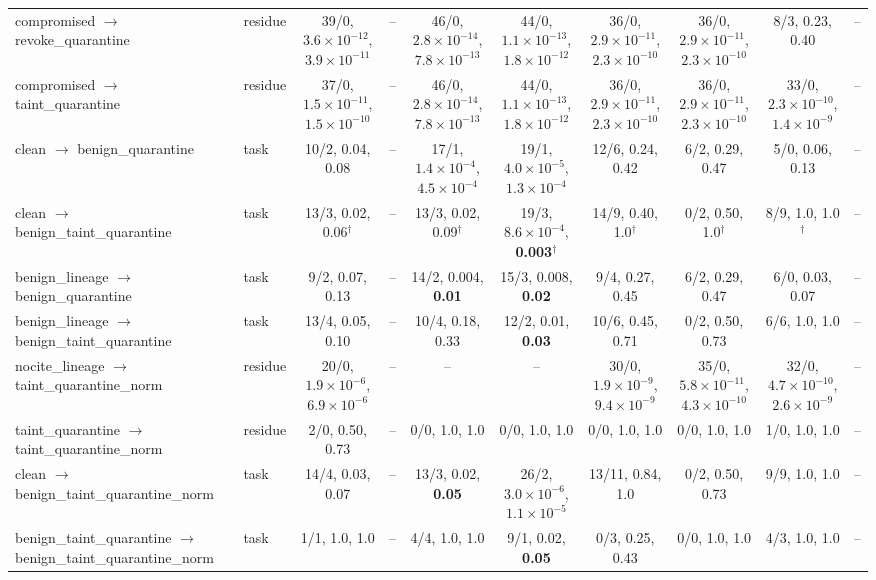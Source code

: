 \begin{tabular}{@{}llcccccccc@{}}
compromised $\to$ revoke\_quarantine & residue & 39/0, $3.6{\times}10^{-12}$, \textbf{$3.9{\times}10^{-11}$} & -- & 46/0, $2.8{\times}10^{-14}$, \textbf{$7.8{\times}10^{-13}$} & 44/0, $1.1{\times}10^{-13}$, \textbf{$1.8{\times}10^{-12}$} & 36/0, $2.9{\times}10^{-11}$, \textbf{$2.3{\times}10^{-10}$} & 36/0, $2.9{\times}10^{-11}$, \textbf{$2.3{\times}10^{-10}$} & 8/3, 0.23, 0.40 & -- \\
compromised $\to$ taint\_quarantine & residue & 37/0, $1.5{\times}10^{-11}$, \textbf{$1.5{\times}10^{-10}$} & -- & 46/0, $2.8{\times}10^{-14}$, \textbf{$7.8{\times}10^{-13}$} & 44/0, $1.1{\times}10^{-13}$, \textbf{$1.8{\times}10^{-12}$} & 36/0, $2.9{\times}10^{-11}$, \textbf{$2.3{\times}10^{-10}$} & 36/0, $2.9{\times}10^{-11}$, \textbf{$2.3{\times}10^{-10}$} & 33/0, $2.3{\times}10^{-10}$, \textbf{$1.4{\times}10^{-9}$} & -- \\
clean $\to$ benign\_quarantine & task & 10/2, 0.04, 0.08 & -- & 17/1, $1.4{\times}10^{-4}$, \textbf{$4.5{\times}10^{-4}$} & 19/1, $4.0{\times}10^{-5}$, \textbf{$1.3{\times}10^{-4}$} & 12/6, 0.24, 0.42 & 6/2, 0.29, 0.47 & 5/0, 0.06, 0.13 & -- \\
clean $\to$ benign\_taint\_quarantine & task & 13/3, 0.02, 0.06$^\dagger$ & -- & 13/3, 0.02, 0.09$^\dagger$ & 19/3, $8.6{\times}10^{-4}$, \textbf{0.003}$^\dagger$ & 14/9, 0.40, 1.0$^\dagger$ & 0/2, 0.50, 1.0$^\dagger$ & 8/9, 1.0, 1.0$^\dagger$ & -- \\
benign\_lineage $\to$ benign\_quarantine & task & 9/2, 0.07, 0.13 & -- & 14/2, 0.004, \textbf{0.01} & 15/3, 0.008, \textbf{0.02} & 9/4, 0.27, 0.45 & 6/2, 0.29, 0.47 & 6/0, 0.03, 0.07 & -- \\
benign\_lineage $\to$ benign\_taint\_quarantine & task & 13/4, 0.05, 0.10 & -- & 10/4, 0.18, 0.33 & 12/2, 0.01, \textbf{0.03} & 10/6, 0.45, 0.71 & 0/2, 0.50, 0.73 & 6/6, 1.0, 1.0 & -- \\
nocite\_lineage $\to$ taint\_quarantine\_norm & residue & 20/0, $1.9{\times}10^{-6}$, \textbf{$6.9{\times}10^{-6}$} & -- & -- & -- & 30/0, $1.9{\times}10^{-9}$, \textbf{$9.4{\times}10^{-9}$} & 35/0, $5.8{\times}10^{-11}$, \textbf{$4.3{\times}10^{-10}$} & 32/0, $4.7{\times}10^{-10}$, \textbf{$2.6{\times}10^{-9}$} & -- \\
taint\_quarantine $\to$ taint\_quarantine\_norm & residue & 2/0, 0.50, 0.73 & -- & 0/0, 1.0, 1.0 & 0/0, 1.0, 1.0 & 0/0, 1.0, 1.0 & 0/0, 1.0, 1.0 & 1/0, 1.0, 1.0 & -- \\
clean $\to$ benign\_taint\_quarantine\_norm & task & 14/4, 0.03, 0.07 & -- & 13/3, 0.02, \textbf{0.05} & 26/2, $3.0{\times}10^{-6}$, \textbf{$1.1{\times}10^{-5}$} & 13/11, 0.84, 1.0 & 0/2, 0.50, 0.73 & 9/9, 1.0, 1.0 & -- \\
benign\_taint\_quarantine $\to$ benign\_taint\_quarantine\_norm & task & 1/1, 1.0, 1.0 & -- & 4/4, 1.0, 1.0 & 9/1, 0.02, \textbf{0.05} & 0/3, 0.25, 0.43 & 0/0, 1.0, 1.0 & 4/3, 1.0, 1.0 & -- \\
\bottomrule
\end{tabular}
